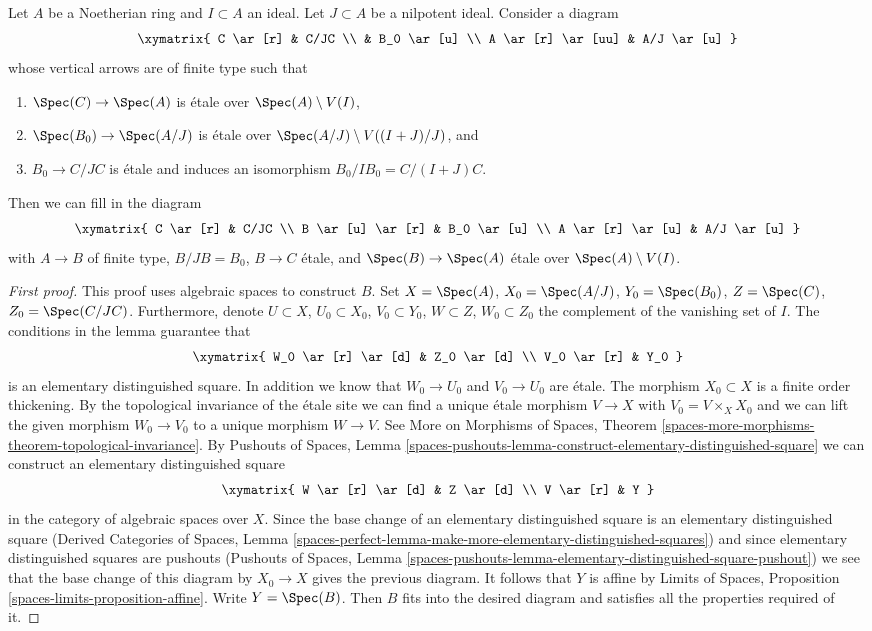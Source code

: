 \begin{lemma}
\label{lemma-lift-approximation}
Let $A$ be a Noetherian ring and $I \subset A$ an ideal.
Let $J \subset A$ be a nilpotent ideal. Consider a diagram
$$
\xymatrix{
C \ar[r] & C/JC \\
& B_0 \ar[u] \\
A \ar[r] \ar[uu] & A/J \ar[u]
}
$$
whose vertical arrows are of finite type such that
\begin{enumerate}
\item $\Spec(C) \to \Spec(A)$ is \'etale over $\Spec(A) \setminus V(I)$,
\item $\Spec(B_0) \to \Spec(A/J)$ is \'etale over
$\Spec(A/J) \setminus V((I + J)/J)$, and
\item $B_0 \to C/JC$ is \'etale and induces an isomorphism
$B_0/IB_0 = C/(I + J)C$.
\end{enumerate}
Then we can fill in the diagram
$$
\xymatrix{
C \ar[r] & C/JC \\
B \ar[u] \ar[r] & B_0 \ar[u] \\
A \ar[r] \ar[u] & A/J \ar[u]
}
$$
with $A \to B$ of finite type, $B/JB = B_0$, $B \to C$ \'etale, and
$\Spec(B) \to \Spec(A)$ \'etale over $\Spec(A) \setminus V(I)$.
\end{lemma}

\begin{proof}[First proof]
This proof uses algebraic spaces to construct $B$. Set
$X = \Spec(A)$, $X_0 = \Spec(A/J)$, $Y_0 = \Spec(B_0)$,
$Z = \Spec(C)$, $Z_0 = \Spec(C/JC)$. Furthermore, denote
$U \subset X$, $U_0 \subset X_0$, $V_0 \subset Y_0$,
$W \subset Z$, $W_0 \subset Z_0$ the complement of the
vanishing set of $I$. The conditions in the lemma guarantee
that
$$
\xymatrix{
W_0 \ar[r] \ar[d] & Z_0 \ar[d] \\
V_0 \ar[r] & Y_0
}
$$
is an elementary distinguished square. In addition we know that
$W_0 \to U_0$ and $V_0 \to U_0$ are \'etale. The morphism
$X_0 \subset X$ is a finite order thickening.
By the topological invariance of the \'etale site
we can find a unique \'etale morphism $V \to X$
with $V_0 = V \times_X X_0$ and we can lift the given morphism
$W_0 \to V_0$ to a unique morphism $W \to V$.
See More on Morphisms of Spaces, Theorem
\ref{spaces-more-morphisms-theorem-topological-invariance}.
By Pushouts of Spaces, Lemma
\ref{spaces-pushouts-lemma-construct-elementary-distinguished-square}
we can construct an elementary distinguished square
$$
\xymatrix{
W \ar[r] \ar[d] & Z \ar[d] \\
V \ar[r] & Y
}
$$
in the category of algebraic spaces over $X$. Since the base change
of an elementary distinguished square is an elementary distinguished
square (Derived Categories of Spaces, Lemma
\ref{spaces-perfect-lemma-make-more-elementary-distinguished-squares})
and since elementary distinguished squares are pushouts
(Pushouts of Spaces, Lemma
\ref{spaces-pushouts-lemma-elementary-distinguished-square-pushout})
we see that the base change of this diagram by
$X_0 \to X$ gives the previous diagram.
It follows that $Y$ is affine by
Limits of Spaces, Proposition \ref{spaces-limits-proposition-affine}.
Write $Y = \Spec(B)$. Then $B$ fits into the desired diagram and
satisfies all the properties required of it.
\end{proof}

